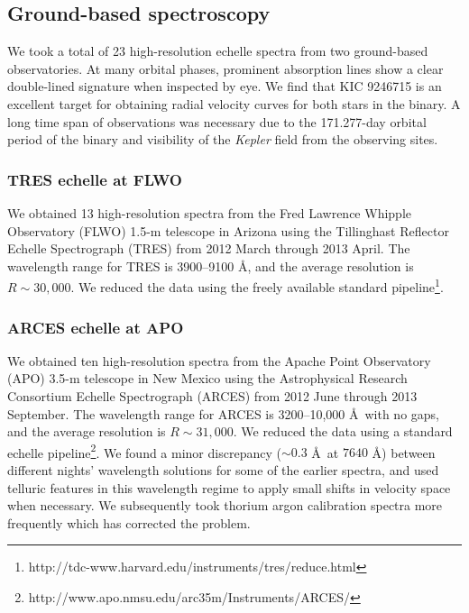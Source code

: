 \subsection{Ground-based spectroscopy}\label{spectra}
We took a total of 23 high-resolution echelle spectra from two ground-based observatories. At many orbital phases, prominent absorption lines show a clear double-lined signature when inspected by eye. We find that KIC 9246715 is an excellent target for obtaining radial velocity curves for both stars in the binary. A long time span of observations was necessary due to the 171.277-day orbital period of the binary and visibility of the \emph{Kepler} field from the observing sites.

\subsubsection{TRES echelle at FLWO}\label{tres}
We obtained 13 high-resolution spectra from the Fred Lawrence Whipple Observatory (FLWO) 1.5-m telescope in Arizona using the Tillinghast Reflector Echelle Spectrograph (TRES) from 2012 March through 2013 April. The wavelength range for TRES is 3900--9100 \AA, and the average resolution is $R \sim 30,000$. We reduced the data using the freely available standard pipeline\footnote{http://tdc-www.harvard.edu/instruments/tres/reduce.html}.

\subsubsection{ARCES echelle at APO}\label{arces}
We obtained ten high-resolution spectra from the Apache Point Observatory (APO) 3.5-m telescope in New Mexico using the Astrophysical Research Consortium Echelle Spectrograph (ARCES) from 2012 June through 2013 September. The wavelength range for ARCES is 3200--10,000 \AA \ with no gaps, and the average resolution is $R \sim 31,000$. We reduced the data using a standard echelle pipeline\footnote{http://www.apo.nmsu.edu/arc35m/Instruments/ARCES/}. We found a minor discrepancy ($\sim 0.3$ \AA \ at $7640$ \AA) between different nights' wavelength solutions for some of the earlier spectra, and used telluric features in this wavelength regime to apply small shifts in velocity space when necessary. We subsequently took thorium argon calibration spectra more frequently which has corrected the problem.
